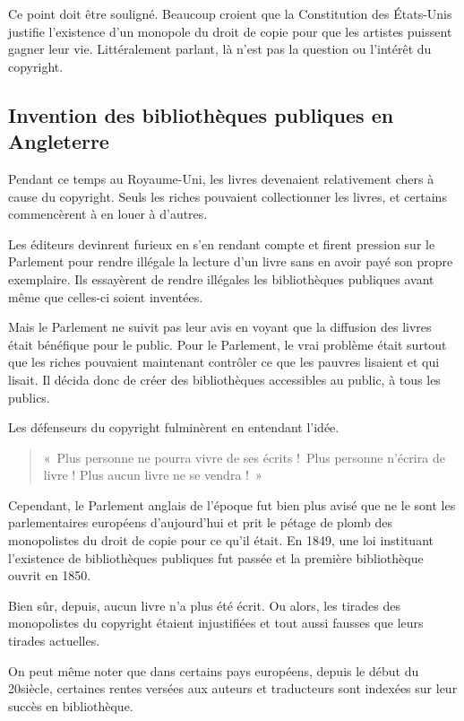 Ce point doit être souligné. Beaucoup croient que la Constitution des États-Unis justifie l'existence d'un monopole du droit de copie
pour que les artistes puissent gagner leur vie. Littéralement
parlant, là n'est pas la question ou l'intérêt du copyright.

\subsection{Invention des bibliothèques publiques en Angleterre}
Pendant ce temps au Royaume-Uni, les livres devenaient relativement chers à cause du copyright. Seuls les riches pouvaient collectionner les livres, et certains commencèrent à en louer à d'autres.

Les éditeurs devinrent furieux en s'en rendant compte et firent pression sur le Parlement pour rendre illégale la lecture d'un livre sans en avoir payé son propre exemplaire. Ils essayèrent de rendre
illégales les bibliothèques publiques avant même que celles-ci soient inventées.

Mais le Parlement ne suivit pas leur avis en voyant que la diffusion des livres était bénéfique pour le public. Pour le Parlement, le vrai problème était surtout que les riches pouvaient maintenant
contrôler ce que les pauvres lisaient et qui lisait. Il décida donc de créer des bibliothèques accessibles au public, à tous les publics.

Les défenseurs du copyright fulminèrent en entendant l'idée. \begin{quotation}
  «~Plus personne ne pourra vivre de ses écrits ! Plus personne n'écrira de livre ! Plus aucun livre ne se vendra !~»                                                            
                                                             \end{quotation}
                                                             
Cependant, le Parlement anglais de l'époque fut bien plus avisé que ne le sont les parlementaires européens d'aujourd'hui et prit le pétage de plomb des monopolistes du droit de copie pour ce qu'il
était. En 1849, une loi instituant l'existence de bibliothèques publiques fut passée et la première bibliothèque ouvrit en 1850.

Bien sûr, depuis, aucun livre n'a plus été écrit. Ou alors, les tirades des monopolistes du copyright étaient injustifiées et tout aussi fausses que leurs tirades actuelles.

On peut même noter que dans certains pays européens, depuis le début du 20\ieme siècle, certaines rentes versées aux auteurs et traducteurs sont indexées sur leur succès en bibliothèque.

